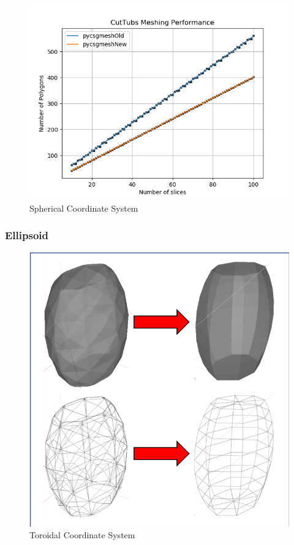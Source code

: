 \documentclass[12pt,a4paper]{article}
\begin{document}
\begin{figure}[h!]
\centering
\includegraphics[scale=0.5]{Images//Quad_fits//CutTubs_quad.png}
\caption[width=\columnwidth]{Spherical Coordinate System}
\label{conts}
\end{figure}

\newpage
\subsubsection{Ellipsoid}

\begin{figure}[h!]
\centering
\includegraphics[scale=0.5]{Images//Meshes//ellipsoid.png}
\caption[width=\columnwidth]{Toroidal Coordinate System}
\label{conts}
\end{figure}
\end{document}
